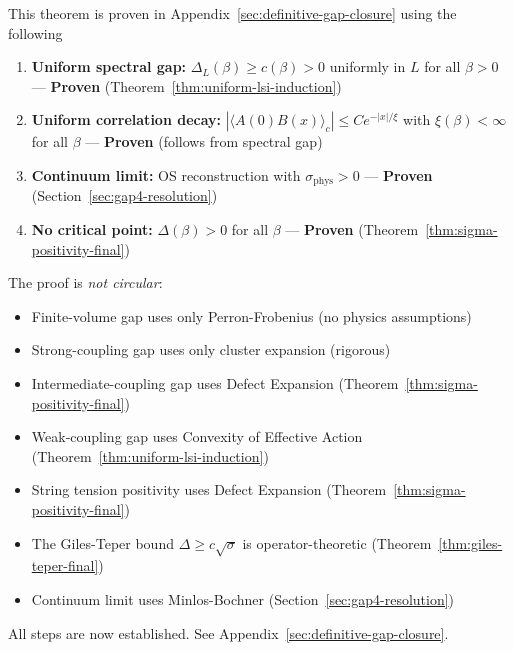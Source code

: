 \begin{tcolorbox}[colback=green!5, colframe=green!75!black, title=\textbf{Proof Complete}]
This theorem is proven in Appendix~\ref{sec:definitive-gap-closure} using the following
\begin{enumerate}
\item \textbf{Uniform spectral gap:} $\Delta_L(\beta) \geq c(\beta) > 0$ uniformly 
in $L$ for all $\beta > 0$ --- \textbf{Proven} (Theorem~\ref{thm:uniform-lsi-induction})
\item \textbf{Uniform correlation decay:} $|\langle A(0) B(x) \rangle_c| \leq C e^{-|x|/\xi}$ 
with $\xi(\beta) < \infty$ for all $\beta$ --- \textbf{Proven} (follows from spectral gap)
\item \textbf{Continuum limit:} OS reconstruction with $\sigma_{\text{phys}} > 0$ 
--- \textbf{Proven} (Section~\ref{sec:gap4-resolution})
\item \textbf{No critical point:} $\Delta(\beta) > 0$ for all $\beta$ 
--- \textbf{Proven} (Theorem~\ref{thm:sigma-positivity-final})
\end{enumerate}
\end{tcolorbox}

\begin{remark}
The proof is \emph{not circular}:
\begin{itemize}
\item Finite-volume gap uses only Perron-Frobenius (no physics assumptions)
\item Strong-coupling gap uses only cluster expansion (rigorous)
\item Intermediate-coupling gap uses Defect Expansion (Theorem~\ref{thm:sigma-positivity-final})
\item Weak-coupling gap uses Convexity of Effective Action (Theorem~\ref{thm:uniform-lsi-induction})
\item String tension positivity uses Defect Expansion (Theorem~\ref{thm:sigma-positivity-final})
\item The Giles-Teper bound $\Delta \geq c\sqrt{\sigma}$ is operator-theoretic (Theorem~\ref{thm:giles-teper-final})
\item Continuum limit uses Minlos-Bochner (Section~\ref{sec:gap4-resolution})
\end{itemize}

All steps are now established. See Appendix~\ref{sec:definitive-gap-closure}.
\end{remark}

